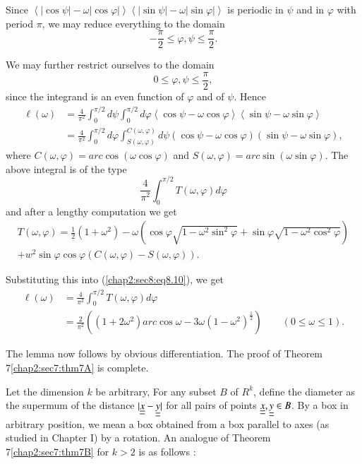 Since $\left<|\cos \psi| -\omega |\cos \varphi|\right> \left<|\sin \psi| - \omega |\sin \varphi|\right>$ is periodic in $\psi$ and in $\varphi$ with period $\pi$, we may reduce everything to the domain
$$
-\frac{\pi}{2} \leq \varphi, \psi \leq \frac{\pi}{2}.
$$

We may further restrict ourselves to the domain
$$
0 \leq \varphi, \psi \leq \frac{\pi}{2},
$$
since the integrand is an even function of $\varphi$ and of $\psi$. Hence
\begin{align*}
\ell(\omega) & = \frac{4}{\pi^{2}} \int_{0}^{\pi/2} d\psi \int_{0}^{\pi/2} d\varphi \left<\cos \psi - \omega \cos \varphi\right> \left<\sin \psi - \omega \sin \varphi\right>\\
 & = \frac{4}{\pi^{2}} \int_{0}^{\pi/2} d\varphi \int_{S(\omega, \varphi)}^{C(\omega, \varphi)} d\psi (\cos \psi - \omega \cos \varphi) (\sin \psi - \omega \sin \varphi), 
\end{align*}\pageoriginale
where $C(\omega, \varphi) = arc \cos (\omega \cos \varphi)$ and $S(\omega, \varphi) = arc \sin (\omega \sin \varphi)$. The above integral is of the type
\begin{equation*}
\frac{4}{\pi^{2}} \int_{0}^{\pi/2} T(\omega, \varphi)d\varphi\tag{8.10}\label{chap2:sec8:eq8.10}
\end{equation*}
and after a lengthy computation we get
\begin{align*}
T(\omega, \varphi) = \frac{1}{2} (1 + \omega^{2}) - \omega (\cos \varphi \sqrt{1 - \omega^{2} \sin^{2} \varphi} + \sin \varphi \sqrt{1 - \omega^{2} \cos^{2} \varphi})\\
+ w^{2} \sin \varphi \cos \varphi (C(\omega, \varphi) - S(\omega, \varphi)).
\end{align*}

Substituting this into (\ref{chap2:sec8:eq8.10}), we get
\begin{align*}
\ell(\omega) & = \frac{4}{\pi^{2}} \int_{0}^{\pi/2} T(\omega, \varphi) d\varphi\\
& = \frac{2}{\pi^{2}} ((1 + 2\omega^{2}) arc \cos \omega - 3\omega(1 - \omega^{2})^{\frac{1}{2}}) \qquad (0 \leq \omega \leq 1).
\end{align*}

The lemma now follows by obvious differentiation. The proof of Theorem 7\ref{chap2:sec7:thm7A} is complete.

Let the dimension $k$ be arbitrary, For any subset $B$ of $R^{k}$, define the diameter as the supermum of the distance $|\underline{\underline{x}}-\underline{\underline{y}}|$ for all pairs of points $\underline{\underline{x}}, \underline{\underline{y}} \in B$. By a box in arbitrary position, we mean a box obtained from a box parallel to axes (as studied in Chapter I) by a rotation. An analogue of Theorem 7\ref{chap2:sec7:thm7B} for $k > 2$ is as follows :

